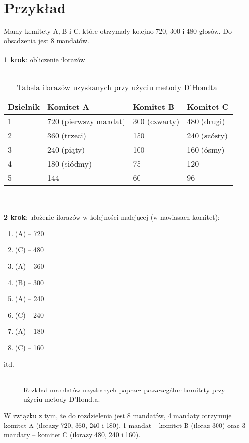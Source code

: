 \documentclass[12pt,a4paper,titlepage]{report}
\begin{document}
\section{Przykład}
Mamy komitety A, B i C, które otrzymały kolejno 720, 300 i 480 głosów. Do obsadzenia jest 8 mandatów. \\ \\
\textbf{1 krok}: obliczenie ilorazów \\ \\
\begin{table}[h]
\begin{tabular}{|l|l|l|l|} \hline
Dzielnik & Komitet A & Komitet B & Komitet C \\
\hline
1 & 720 (pierwszy mandat) & 300 (czwarty) & 480 (drugi) \\
\hline
2 & 360 (trzeci) & 150 & 240 (szósty) \\
\hline
3 & 240 (piąty) & 100 & 160 (ósmy) \\ 
\hline
4 & 180 (siódmy) & 75 & 120 \\ \hline
5 & 144 & 60 & 96 \\
\hline

\end{tabular}
\caption{Tabela ilorazów uzyskanych przy użyciu metody D'Hondta.}
\end{table}\\ \\
\textbf{2 krok}: ułożenie ilorazów w kolejności malejącej (w nawiasach komitet):
\begin{enumerate}
\item (A) – 720
\item (C) – 480
\item (A) – 360
\item (B) – 300
\item (A) – 240
\item (C) – 240
\item (A) – 180
\item (C) – 160
\end{enumerate} 
itd. \\ \\
\begin{figure} [!htbp]
\caption{Rozkład mandatów uzyskanych poprzez poszczególne komitety przy użyciu metody D'Hondta.}
\end{figure}
W związku z tym, że do rozdzielenia jest 8 mandatów, 4 mandaty otrzymuje komitet A (ilorazy 720, 360, 240 i 180), 1 mandat – komitet B (iloraz 300) oraz 3 mandaty – komitet C (ilorazy 480, 240 i 160). \\ \\
\end{document}
